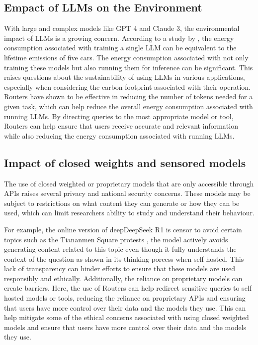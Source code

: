 \subsection{Empact of LLMs on the Environment}
\label{sec:discussion-impact-of-llms-on-the-environment}

With large and complex models like GPT 4 and Claude 3, the environmental impact of LLMs is a growing concern. According to a study by \citep{strubell2019energypolicyconsiderationsdeep}, the energy consumption associated with training a single LLM can be equivalent to the lifetime emissions of five cars. The energy consumption associated with not only training these models but also running them for inference can be significant. This raises questions about the sustainability of using LLMs in various applications, especially when considering the carbon footprint associated with their operation. Routers have shown to be effective in reducing the number of tokens needed for a given task, which can help reduce the overall energy consumption associated with running LLMs. By directing queries to the most appropriate model or tool, Routers can help ensure that users receive accurate and relevant information while also reducing the energy consumption associated with running LLMs.

\subsection{Impact of closed weights and sensored models}
\label{sec:discussion-impact-of-closed-weights-and-sensored-models}

The use of closed weighted or proprietary models that are only accessible through APIs raises several privacy and national security concerns. These models may be subject to restrictions on what content they can generate or how they can be used, which can limit researchers ability to study and understand their behaviour. 

For example, the online version of deepDeepSeek R1 is censor to avoid certain topics such as the Tiananmen Square protests \citep{independent-deepseek}, the model actively avoids generating content related to this topic even though it fully understands the context of the question as shown in its thinking porcess when self hosted\citep{jeramos-deepseek}. This lack of transparency can hinder efforts to ensure that these models are used responsibly and ethically. Additionally, the reliance on proprietary models can create barriers. Here, the use of Routers can help redirect sensitive queries to self hosted models or tools, reducing the reliance on proprietary APIs and ensuring that users have more control over their data and the models they use. This can help mitigate some of the ethical concerns associated with using closed weighted models and ensure that users have more control over their data and the models they use.

